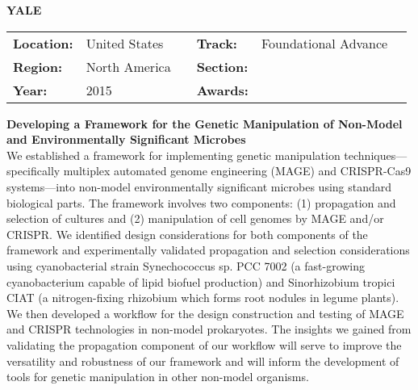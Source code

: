 \textbf{\uppercase{Yale}} \FloatBarrier \begin{table}[h] \begin{tabular}{lp{2.5cm}llll} \textbf{Location:} & United States & \multicolumn{1}{|l}{} & \textbf{Track:}   & Foundational Advance \\ \textbf{Region:}   & North America   & \multicolumn{1}{|l}{} & \textbf{Section:} &  \\ \textbf{Year:}     & 2015   & \multicolumn{1}{|l}{} & \textbf{Awards:}  & \end{tabular} \end{table} \FloatBarrier \noindent\textbf{Developing a Framework for the Genetic Manipulation of Non-Model and Environmentally Significant Microbes} \vspace{.2cm}\\ 
We established a framework for implementing genetic manipulation techniques—specifically multiplex automated genome engineering (MAGE) and CRISPR-Cas9 systems—into non-model environmentally significant microbes using standard biological parts. The framework involves two components: (1) propagation and selection of cultures and (2) manipulation of cell genomes by MAGE and/or CRISPR. We identified design considerations for both components of the framework and experimentally validated propagation and selection considerations using cyanobacterial strain Synechococcus sp. PCC 7002 (a fast-growing cyanobacterium capable of lipid biofuel production) and Sinorhizobium tropici CIAT (a nitrogen-fixing rhizobium which forms root nodules in legume plants). We then developed a workflow for the design construction and testing of MAGE and CRISPR technologies in non-model prokaryotes. The insights we gained from validating the propagation component of our workflow will serve to improve the versatility and robustness of our framework and will inform the development of tools for genetic manipulation in other non-model organisms.
\vspace{2cm}

